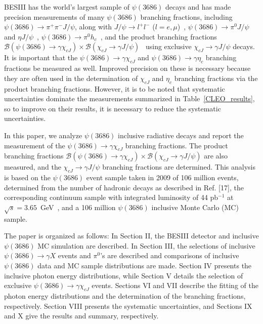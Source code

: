 \documentclass[aps,prd,twocolumn,showpacs,floatfix,byrevtex]{revtex4-1}
\begin{document}
BESIII has the world's largest sample of $\psi(3686)$ decays and has
made precision measurements of many $\psi(3686)$ branching fractions,
including $\psi(3686) \to \pi^+ \pi^- J/\psi$, along with $J/\psi \to
l^+ l^-$ ($l = e, \mu$)~\cite{pipij}, $\psi(3686) \to \pi^0 J/\psi$
and $\eta J/\psi$~\cite{pi0jpsi}, $\psi(3686) \to \pi^0
h_c$~\cite{brhc1,brhc2}, and the product branching fractions
$\mathcal{B}(\psi(3686) \to \gamma \chi_{cJ})\times
\mathcal{B}(\chi_{cJ} \to \gamma J/\psi)$~\cite{xiaorui,bam158} using
exclusive $\chi_{cJ} \to \gamma J/\psi$ decays.  It is important that
the $\psi(3686) \to \gamma \chi_{cJ}$ and $\psi(3686) \to \gamma
\eta_c$ branching fractions be measured as well. Improved precision on
these is necessary because they are often used in the determination of
$\chi_{cJ}$ and $\eta_c$ branching fractions via the product branching
fractions.  However, it is to be noted that systematic uncertainties
dominate the measurements summarized in Table~\ref{CLEO_results}, so
to improve on their results, it is necessary to reduce the systematic
uncertainties.

In this paper, we analyze $\psi(3686)$ inclusive radiative decays and
report the measurement of the $\psi(3686) \to \gamma \chi_{cJ}$
branching fractions.  The product branching fractions
$\mathcal{B}(\psi(3686) \to \gamma \chi_{cJ})\times
\mathcal{B}(\chi_{cJ} \to \gamma J/\psi)$ are also measured, and the
$\chi_{cJ} \to \gamma J/\psi$ branching fractions are determined.
This analysis is based on the $\psi(3686)$ event sample taken in 2009 of
106 million events, determined from the number of hadronic decays as
described in Ref. [17], the corresponding continuum sample with
integrated luminosity of 44 pb$^{-1}$ at $\sqrt{s} =
3.65$~GeV~\cite{Npsip}, and a 106 million $\psi(3686)$ inclusive Monte
Carlo (MC) sample.

The paper is organized as follows: In Section II, the BESIII detector
and inclusive $\psi(3686)$ MC simulation are described. In Section
III, the selections of inclusive $\psi(3686) \to \gamma X$ events and
$\pi^0$'s are described and comparisons of inclusive $\psi(3686)$ data
and MC sample distributions are made. Section IV presents the
inclusive photon energy distributions, while Section V details the
selection of exclusive $\psi(3686) \to \gamma \chi_{cJ}$ events.
Sections VI and VII describe the fitting of the photon energy
distributions and the determination of the branching fractions,
respectively. Section VIII presents the systematic uncertainties, and
Sections IX and X give the results and summary, respectively.
\end{document}
